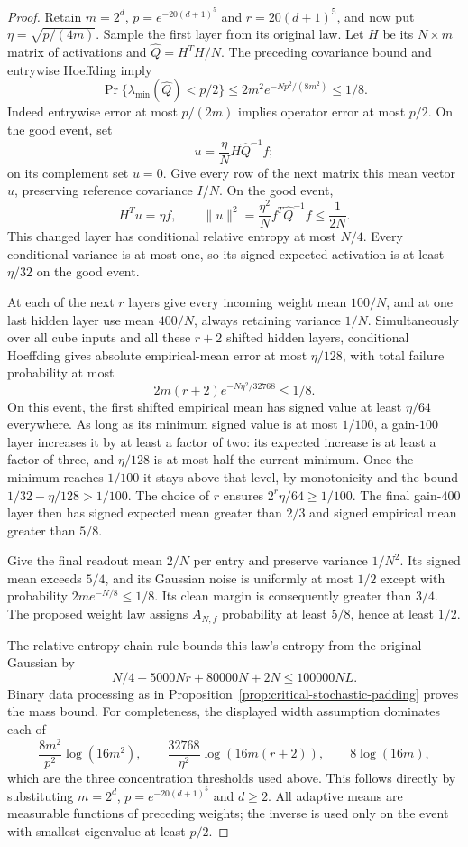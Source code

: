\begin{proof}
Retain $m=2^d$, $p=e^{-20(d+1)^5}$ and $r=20(d+1)^5$, and now put
$\eta=\sqrt{p/(4m)}$. Sample the first layer from its original law.
Let $H$ be its $N\times m$ matrix of activations and
$\widehat Q=H^TH/N$. The preceding covariance bound and entrywise
Hoeffding imply
\[
 \Pr\{\lambda_{\min}(\widehat Q)<p/2\}
 \le2m^2e^{-Np^2/(8m^2)}\le1/8.
\]
Indeed entrywise error at most $p/(2m)$ implies operator error at most
$p/2$. On the good event, set
\[
 u=\frac\eta N H\widehat Q^{-1}f;
\]
on its complement set $u=0$. Give every row of the next matrix this
mean vector $u$, preserving reference covariance $I/N$.
On the good event,
\[
 H^Tu=\eta f,\qquad
 \|u\|^2=\frac{\eta^2}{N}f^T\widehat Q^{-1}f
             \le\frac1{2N}.
\]
This changed layer has conditional relative entropy at most $N/4$.
Every conditional variance is at most one, so its signed expected
activation is at least $\eta/32$ on the good event.

At each of the next $r$ layers give every incoming weight mean $100/N$,
and at one last hidden layer use mean $400/N$, always retaining
variance $1/N$. Simultaneously over all cube inputs and all these
$r+2$ shifted hidden layers, conditional Hoeffding gives absolute
empirical-mean error at most $\eta/128$, with total failure probability
at most
\[
 2m(r+2)e^{-N\eta^2/32768}\le1/8.
\]
On this event, the first shifted empirical mean has signed value at
least $\eta/64$ everywhere. As long as its minimum signed value is
at most $1/100$, a gain-$100$ layer increases it by at least a factor
of two: its expected increase is at least a factor of three, and
$\eta/128$ is at most half the current minimum. Once the minimum
reaches $1/100$ it stays above that level, by monotonicity and the
bound $1/32-\eta/128>1/100$.
The choice of $r$ ensures $2^r\eta/64\ge1/100$.
The final gain-$400$ layer then has signed expected mean greater than
$2/3$ and signed empirical mean greater than $5/8$.

Give the final readout mean $2/N$ per entry and preserve variance
$1/N^2$. Its signed mean exceeds $5/4$, and its Gaussian noise is
uniformly at most $1/2$ except with probability
$2m e^{-N/8}\le1/8$. Its clean margin is consequently greater than
$3/4$. The proposed weight law assigns $A_{N,f}$ probability at least
$5/8$, hence at least $1/2$.

The relative entropy chain rule bounds this law's entropy from the
original Gaussian by
\[
 N/4+5000Nr+80000N+2N\le100000NL.
\]
Binary data processing as in
Proposition~\ref{prop:critical-stochastic-padding} proves the mass bound.
For completeness, the displayed width assumption dominates each of
\[
 \frac{8m^2}{p^2}\log(16m^2),\qquad
 \frac{32768}{\eta^2}\log(16m(r+2)),\qquad 8\log(16m),
\]
which are the three concentration thresholds used above. This follows
directly by substituting $m=2^d$, $p=e^{-20(d+1)^5}$ and $d\ge2$.
All adaptive means are measurable functions of preceding weights;
the inverse is used only on the event with smallest eigenvalue at
least $p/2$.
\end{proof}
